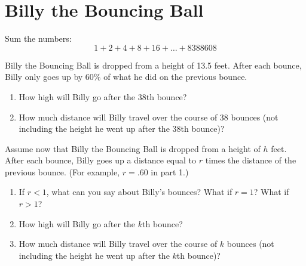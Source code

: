 \newpage
\section{Billy the Bouncing Ball}\label{A:billy}

\begin{prob}
Sum the numbers:
\[
1 + 2 + 4 + 8 + 16 + \dots + 8388608
\]
\end{prob}



\begin{prob}
Billy the Bouncing Ball is dropped from a height of 13.5 feet.  After
each bounce, Billy only goes up by $60\%$ of what he did on the
previous bounce.

\begin{enumerate}
\item How high will Billy go after the 38th bounce?
\item How much distance will Billy travel over the course of 38
  bounces (not including the height he went up after the 38th
  bounce)?
\end{enumerate}
\end{prob}

\begin{prob}
Assume now that Billy the Bouncing Ball is dropped from a height of
$h$ feet. After each bounce, Billy goes up a distance equal to $r$
times the distance of the previous bounce. (For example, $r=.60$ in
part 1.)
\begin{enumerate}
\item If $r<1$, what can you say about Billy's bounces? What if $r=1$?
  What if $r>1$?
\item How high will Billy go after the $k$th bounce?
\item How much distance will Billy travel over the course of $k$
  bounces (not including the height he went up after the $k$th
  bounce)?
\end{enumerate}
\end{prob}


